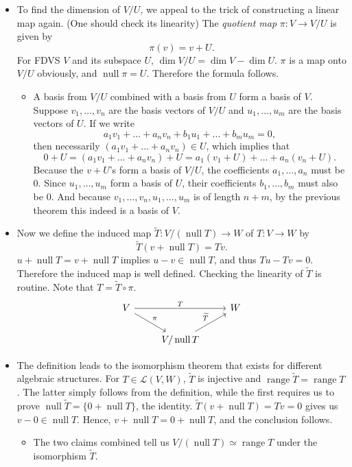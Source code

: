 \documentclass[11pt]{article}
\newcommand{\df}[1]{\textit{\textsf{#1}}}
\newcommand{\n}{\operatorname{null}}
\renewcommand{\r}{\operatorname{range}}
\renewcommand{\d}{\dim}
\newcommand{\LVW}{\mathcal{L}(V,W)}
\begin{document}
\begin{itemize}
\begin{itemize}
    \end{itemize}
    \item To find the dimension of $V/U$, we appeal to the trick of constructing a linear map again. (One should check its linearity) The \df{quotient map} $\pi: V \to V/U$ is given by $$\pi(v) = v+U.$$
    For FDVS $V$ and its subspace $U$, $\d V/U = \d V - \d U$. $\pi$ is a map onto $V/U$ obviously, and $\n \pi = U$. Therefore the formula follows.
    \begin{itemize}
        \item A basis from $V/U$ combined with a basis from $U$ form a basis of $V$. Suppose $v_1,\dots,v_n$ are the basis vectors of $V/U$ and $u_1,\dots,u_m$ are the basis vectors of $U$. If we write $$a_1v_1+\dots+a_nv_n + b_1u_1+\dots+b_mu_m = 0,$$ then necessarily $(a_1v_1+\dots+a_nv_n) \in U$, which implies that $$0+U = (a_1v_1+\dots+a_nv_n)+U = a_1(v_1+U)+\dots+a_n(v_n+U).$$ Because the $v+U$'s form a basis of $V/U$, the coefficients $a_1,\dots,a_n$ must be 0. Since $u_1,\dots,u_m$ form a basis of $U$, their coefficients $b_1,\dots,b_m$ must also be 0. And because $v_1,\dots,v_n,u_1,\dots,u_m$ is of length $n+m$, by the previous theorem this indeed is a basis of $V$.
    \end{itemize}
    \item Now we define the induced map $\widetilde{T}: V/(\n T) \to W$ of $T: V \to W$ by \[\widetilde{T}(v+\n T) = Tv.\] $u + \n T = v + \n T$ implies $u - v \in \n T$, and thus $Tu-Tv = 0$. Therefore the induced map is well defined. Checking the linearity of $\widetilde{T}$ is routine. Note that $T = \widetilde{T} \circ \pi$.
        \[
            \begin{tikzcd}
                V \arrow[rr,"T"] \arrow[dr,"\pi"] && W \\
                & {V/\n T} \arrow[ur,"\widetilde{T}"]
            \end{tikzcd}
        \]
    \item The definition leads to the isomorphism theorem that exists for different algebraic structures. For $T \in \LVW$, $\widetilde{T}$ is injective and $\r \widetilde{T} = \r T$. The latter simply follows from the definition, while the first requires us to prove $\n \widetilde{T} = \{0+\n T\}$, the identity. $\widetilde{T}(v+\n T) = Tv = 0$ gives us $v-0 \in \n T$. Hence, $v+\n T = 0+\n T$, and the conclusion follows.
        \begin{itemize}
            \item The two claims combined tell us $V/(\n T) \simeq \r T$ under the isomorphism $\widetilde{T}$.
        \end{itemize}
    \end{itemize}
    
\end{document}
